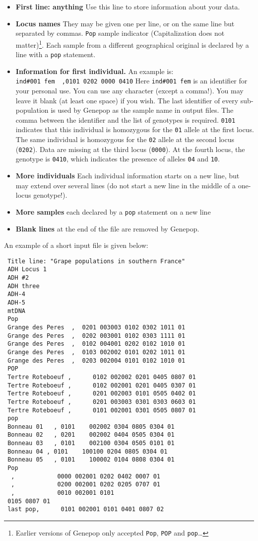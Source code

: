 \documentclass[
  12pt,
]{book}
\providecommand{\tightlist}{%
  \setlength{\itemsep}{0pt}\setlength{\parskip}{0pt}}
\begin{document}
\begin{itemize}
\tightlist
\item
  \textbf{First line: anything} Use this line to store information about your data.
\item
  \textbf{Locus names} They may be given one per line, or on the same line but separated by commas.
  \texttt{Pop} sample indicator (Capitalization does not matter)\footnote{Earlier versions of Genepop only accepted \texttt{Pop}, \texttt{POP} and \texttt{pop}\ldots{}}. Each sample from a different geographical original is declared by a line with a \texttt{pop} statement.
\item
  \textbf{Information for first individual.} An example is:
  \texttt{ind\#001\ fem\ \ ,0101\ 0202\ 0000\ 0410}
  Here \texttt{ind\#001\ fem} is an identifier for your personal use. You can use any character (except a comma!). You may leave it blank (at least one space) if you wish. The last identifier of every sub-population is used by Genepop as the sample name in output files. The comma between the identifier and the list of genotypes is required. \texttt{0101} indicates that this individual is homozygous for the \texttt{01} allele at the first locus. The same individual is homozygous for the \texttt{02} allele at the second locus (\texttt{0202}). Data are missing at the third locus (\texttt{0000}). At the fourth locus, the genotype is \texttt{0410}, which indicates the presence of alleles \texttt{04} and \texttt{10}.
\item
  \textbf{More individuals} Each individual information starts on a new line, but may extend over several lines (do not start a new line in the middle of a one-locus genotype!).
\item
  \textbf{More samples} each declared by a \texttt{pop} statement on a new line
\item
  \textbf{Blank lines} at the end of the file are removed by Genepop.
\end{itemize}

An example of a short input file is given below:

\begin{verbatim}
 Title line: "Grape populations in southern France"
 ADH Locus 1
 ADH #2
 ADH three
 ADH-4
 ADH-5
 mtDNA
 Pop
 Grange des Peres  ,  0201 003003 0102 0302 1011 01
 Grange des Peres  ,  0202 003001 0102 0303 1111 01
 Grange des Peres  ,  0102 004001 0202 0102 1010 01
 Grange des Peres  ,  0103 002002 0101 0202 1011 01
 Grange des Peres  ,  0203 002004 0101 0102 1010 01
 POP
 Tertre Roteboeuf ,      0102 002002 0201 0405 0807 01
 Tertre Roteboeuf ,      0102 002001 0201 0405 0307 01
 Tertre Roteboeuf ,      0201 002003 0101 0505 0402 01
 Tertre Roteboeuf ,      0201 003003 0301 0303 0603 01
 Tertre Roteboeuf ,      0101 002001 0301 0505 0807 01
 pop
 Bonneau 01   , 0101    002002 0304 0805 0304 01
 Bonneau 02   , 0201    002002 0404 0505 0304 01
 Bonneau 03   , 0101    002100 0304 0505 0101 01
 Bonneau 04 , 0101    100100 0204 0805 0304 01
 Bonneau 05   , 0101    100002 0104 0808 0304 01
 Pop
  ,            0000 002001 0202 0402 0007 01
  ,            0200 002001 0202 0205 0707 01
  ,            0010 002001 0101
 0105 0807 01
 last pop,      0101 002001 0101 0401 0807 02
\end{verbatim}
\end{document}
